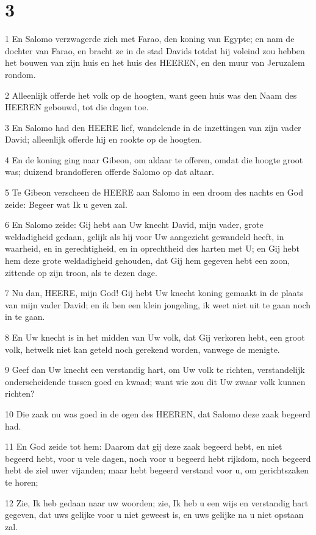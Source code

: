 \chapter{3}

\par 1 En Salomo verzwagerde zich met Farao, den koning van Egypte; en nam de dochter van Farao, en bracht ze in de stad Davids totdat hij voleind zou hebben het bouwen van zijn huis en het huis des HEEREN, en den muur van Jeruzalem rondom.
\par 2 Alleenlijk offerde het volk op de hoogten, want geen huis was den Naam des HEEREN gebouwd, tot die dagen toe.
\par 3 En Salomo had den HEERE lief, wandelende in de inzettingen van zijn vader David; alleenlijk offerde hij en rookte op de hoogten.
\par 4 En de koning ging naar Gibeon, om aldaar te offeren, omdat die hoogte groot was; duizend brandofferen offerde Salomo op dat altaar.
\par 5 Te Gibeon verscheen de HEERE aan Salomo in een droom des nachts en God zeide: Begeer wat Ik u geven zal.
\par 6 En Salomo zeide: Gij hebt aan Uw knecht David, mijn vader, grote weldadigheid gedaan, gelijk als hij voor Uw aangezicht gewandeld heeft, in waarheid, en in gerechtigheid, en in oprechtheid des harten met U; en Gij hebt hem deze grote weldadigheid gehouden, dat Gij hem gegeven hebt een zoon, zittende op zijn troon, als te dezen dage.
\par 7 Nu dan, HEERE, mijn God! Gij hebt Uw knecht koning gemaakt in de plaats van mijn vader David; en ik ben een klein jongeling, ik weet niet uit te gaan noch in te gaan.
\par 8 En Uw knecht is in het midden van Uw volk, dat Gij verkoren hebt, een groot volk, hetwelk niet kan geteld noch gerekend worden, vanwege de menigte.
\par 9 Geef dan Uw knecht een verstandig hart, om Uw volk te richten, verstandelijk onderscheidende tussen goed en kwaad; want wie zou dit Uw zwaar volk kunnen richten?
\par 10 Die zaak nu was goed in de ogen des HEEREN, dat Salomo deze zaak begeerd had.
\par 11 En God zeide tot hem: Daarom dat gij deze zaak begeerd hebt, en niet begeerd hebt, voor u vele dagen, noch voor u begeerd hebt rijkdom, noch begeerd hebt de ziel uwer vijanden; maar hebt begeerd verstand voor u, om gerichtszaken te horen;
\par 12 Zie, Ik heb gedaan naar uw woorden; zie, Ik heb u een wijs en verstandig hart gegeven, dat uws gelijke voor u niet geweest is, en uws gelijke na u niet opstaan zal.
